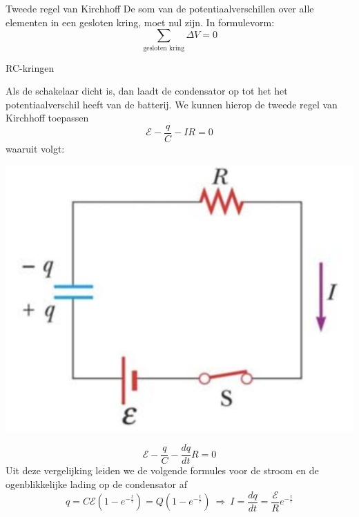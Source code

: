 \begin{theo}{Tweede regel van Kirchhoff}
    De som van de potentiaalverschillen over alle elementen in een gesloten kring, moet nul zijn. In formulevorm:
    \begin{equation*}
        \sum_{\text{gesloten kring}} \Delta V = 0
    \end{equation*}
    \vspace{-0.4cm}
\end{theo}

\newpage

\begin{app}[RC-kringen]{RC-kringen}
    \vspace{-0.3cm}
    \begin{minipage}{.73\textwidth}
        Als de schakelaar dicht is, dan laadt de condensator op tot het het potentiaalverschil heeft van de batterij.
        We kunnen hierop de tweede regel van Kirchhoff toepassen
        \begin{equation*}
            \mathcal{E} - \dfrac{q}{C} - IR = 0
        \end{equation*}
        waaruit volgt:
    \end{minipage}
    \begin{minipage}{.25\textwidth}
       \includegraphics[scale = 0.15]{Images/Elektriciteit/RC-kring.png}
    \end{minipage}
    \vspace{-0.5cm}
    \begin{equation*}
        \mathcal{E} - \dfrac{q}{C} - \frac{dq}{dt}R = 0
    \end{equation*}
    \noindent Uit deze vergelijking leiden we de volgende formules voor de stroom en de ogenblikkelijke lading op de condensator af
    \begin{equation*}
        q = C\mathcal{E}\left(1-e^{-\tfrac{t}{\tau}}\right)= Q\left(1-e^{-\tfrac{t}{\tau}}\right) \ \Rightarrow \ I = \dfrac{dq}{dt} = \dfrac{\mathcal{E}}{R}e^{-\tfrac{t}{\tau}}
    \end{equation*}


\end{app}
